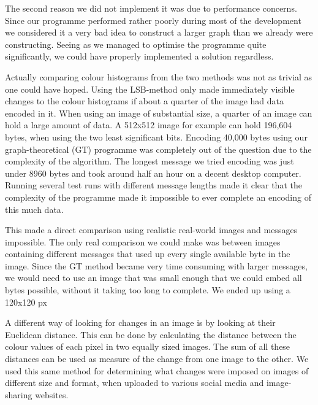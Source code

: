 The second reason we did not implement it was due to performance concerns.
Since our programme performed rather poorly during most of the development we considered it a very bad idea to construct a larger graph than we already were constructing.
Seeing as we managed to optimise the programme quite significantly, we could have properly implemented a solution regardless.

Actually comparing colour histograms from the two methods was not as trivial as one could have hoped.
Using the LSB-method only made immediately visible changes to the colour histograms if about a quarter of the image had data encoded in it.
When using an image of substantial size, a quarter of an image can hold a large amount of data. 
A 512x512 image for example can hold 196,604 bytes, when using the two least significant bits.
Encoding 40,000 bytes using our graph-theoretical (GT) programme was completely out of the question due to the complexity of the algorithm.
The longest message we tried encoding was just under 8960 bytes and took around half an hour on a decent desktop computer.
Running several test runs with different message lengths made it clear that the complexity of the programme made it impossible to ever complete an encoding of this much data.

This made a direct comparison using realistic real-world images and messages impossible. 
The only real comparison we could make was between images containing different messages that used up every single available byte in the image.
Since the GT method became very time consuming with larger messages, we would need to use an image that was small enough that we could embed all bytes possible, without it taking too long to complete.
We ended up using a 120x120 px


A different way of looking for changes in an image is by looking at their Euclidean distance.
This can be done by calculating the distance between the colour values of each pixel in two equally sized images.
The sum of all these distances can be used as measure of the change from one image to the other.
We used this same method for determining what changes were imposed on images of different size and format, when uploaded to various social media and image-sharing websites.

